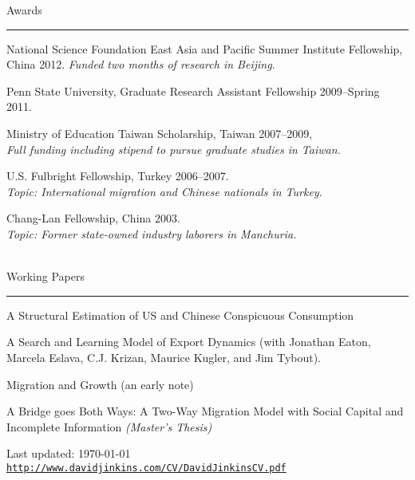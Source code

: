 \documentclass[letterpaper]{article}
\def\footerlink{http://www.davidjinkins.com/CV/DavidJinkinsCV.pdf}
\renewenvironment{itemize}{
  \begin{list}{}{
    \setlength{\leftmargin}{1.5em}
  }
}{
  \end{list}
}
\begin{document}
\vspace{4mm}
{\Large Awards}
\vspace{1mm}
 \hrule

\begin{itemize}
    \item National Science Foundation East Asia and Pacific Summer Institute Fellowship, China 2012.
	\hspace*{1cm}\emph{Funded two months of research in Beijing.}
\item Penn State University, Graduate Research Assistant Fellowship 2009--Spring 2011.
\item Ministry of Education Taiwan Scholarship, Taiwan 2007--2009,\\
	\hspace*{1cm}\emph{Full funding including stipend to pursue graduate studies in Taiwan.}
\item U.S. Fulbright Fellowship, Turkey 2006--2007.\\
	\hspace*{1cm}\emph{Topic: International migration and Chinese nationals in Turkey}.
\item Chang-Lan Fellowship, China 2003.\\
	\hspace*{1cm}\emph{Topic: Former state-owned industry laborers in Manchuria.} \\ \\
\end{itemize}

\vspace{4mm}
{\Large Working Papers}
\vspace{1mm}
 \hrule
\begin{itemize}
 \item A Structural Estimation of US and Chinese Conspicuous Consumption
 \item A Search and Learning Model of Export Dynamics (with Jonathan Eaton, Marcela Eslava, C.J. Krizan, Maurice Kugler, and Jim Tybout).
 \item Migration and Growth (an early note)
 \item A Bridge goes Both Ways: A Two-Way Migration Model with Social Capital and Incomplete Information \emph{(Master's Thesis)}
\end{itemize}

\bigskip

\begin{center}
  \begin{footnotesize}
    Last updated: \today \\
    \href{\footerlink}{\texttt{\footerlink}}
  \end{footnotesize}
\end{center}
\end{document}
